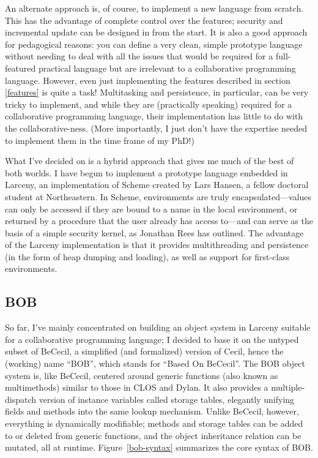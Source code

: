 \documentclass{article}
\begin{document}
An alternate approach is, of course, to implement a new language from
scratch.  This has the advantage of complete control over the
features; security and incremental update can be designed in from the
start.  It is also a good approach for pedagogical reasons: you can
define a very clean, simple prototype language without needing to deal 
with all the issues that would be required for a full-featured
practical language but are irrelevant to a collaborative programming
language.  However, even just implementing the features described in
section \ref{features} is quite a task!  Multitasking and persistence, 
in particular, can be very tricky to implement, and while they are
(practically speaking) required for a collaborative programming
language, their implementation has little to do with the
collaborative-ness.  (More importantly, I just don't have the
expertise needed to implement them in the time frame of my PhD!)

What I've decided on is a hybrid approach that gives me much of the
best of both worlds.  I have begun to implement a prototype language
embedded in Larceny, an implementation of Scheme created by Lars
Hansen, a fellow doctoral student at Northeastern.  In Scheme,
environments are truly encapsulated---values can only be accessed if
they are bound to a name in the local environment, or returned by a
procedure that the user already has access to---and can serve as the
basis of a simple security kernel, as Jonathan Rees has
outlined\cite{W7}.  The advantage of the Larceny implementation is
that it provides multithreading and persistence (in the form of heap
dumping and loading), as well as support for first-class environments.

\subsection{BOB}

So far, I've mainly concentrated on building an object system in
Larceny suitable for a collaborative programming language; I decided
to base it on the untyped subset of BeCecil\cite{BeCecil}, a
simplified (and formalized) version of Cecil\cite{Cecil}, hence the
(working) name ``BOB'', which stands for ``Based On BeCecil''.  The
BOB object system is, like BeCecil, centered around generic functions
(also known as multimethods) similar to those in CLOS and Dylan.  It
also provides a multiple-dispatch version of instance variables called
storage tables, elegantly unifying fields and methods into the same
lookup mechanism.  Unlike BeCecil, however, everything is dynamically
modifiable; methods and storage tables can be added to or deleted from
generic functions, and the object inheritance relation can be mutated,
all at runtime.  Figure~\ref{bob-syntax} summarizes the core syntax of
BOB.
\end{document}
